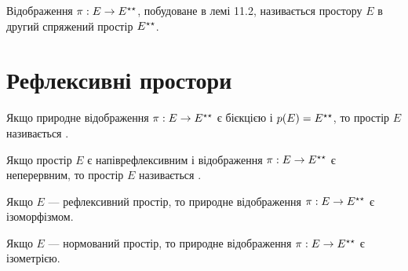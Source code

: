 \begin{definition}
Відображення $\pi: E \to E^{\star\star}$, побудоване в
лемі 11.2, називається  простору
$E$ в другий спряжений простір $E^{\star\star}$.
\end{definition}

\section{Рефлексивні простори}

\begin{definition}
Якщо природне відображення $\pi: E \to E^{\star\star}$ є
бієкцією і $p(E) = E^{\star\star}$, то простір $E$ називається
.
\end{definition}

\begin{definition}
Якщо простір $E$ є напіврефлексивним і
відображення $\pi: E \to E^{\star\star}$ є неперервним, то простір $E$
називається .
\end{definition}

\begin{remark}
Якщо $E$ --- рефлексивний простір, то
природне відображення $\pi: E \to E^{\star\star}$ є ізоморфізмом.
\end{remark}

\begin{theorem}
Якщо $E$ --- нормований простір, то
природне відображення $\pi: E \to E^{\star\star}$ є ізометрією.
\end{theorem}

